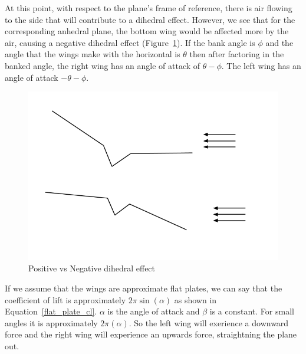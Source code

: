 At this point, with respect to the plane's frame of reference, there is air flowing 
to the side that will contribute to a dihedral effect. However, we see that for the
corresponding anhedral plane, the bottom wing would be affected more by the air, causing
a negative dihedral effect (Figure~\ref{fig:dihedral2}). If the bank angle is $\phi$ and
the angle that the wings make with the horizontal is $\theta$ then after factoring in
the banked angle, the right wing has an angle of attack of  $\theta - \phi$.
The left wing has an angle of attack $- \theta - \phi$.

\begin{figure}[hl]
  \centering
    \includegraphics[scale=.5]{figures/dihedral2.png}
    \caption{Positive vs Negative dihedral effect}
  \label{fig:dihedral2}
\end{figure}

If we assume that the wings are approximate flat plates, we can say that the
coefficient of lift is approximately $2\pi\sin(\alpha)$ as shown in Equation~\ref{flat_plate_cl}. 
$\alpha$ is
the angle of attack and $\beta$ is a constant. For small angles it is 
approximately $2\pi(\alpha)$. So the left wing will exerience a downward force
and the right wing will experience an upwards force, straightning the plane out.


